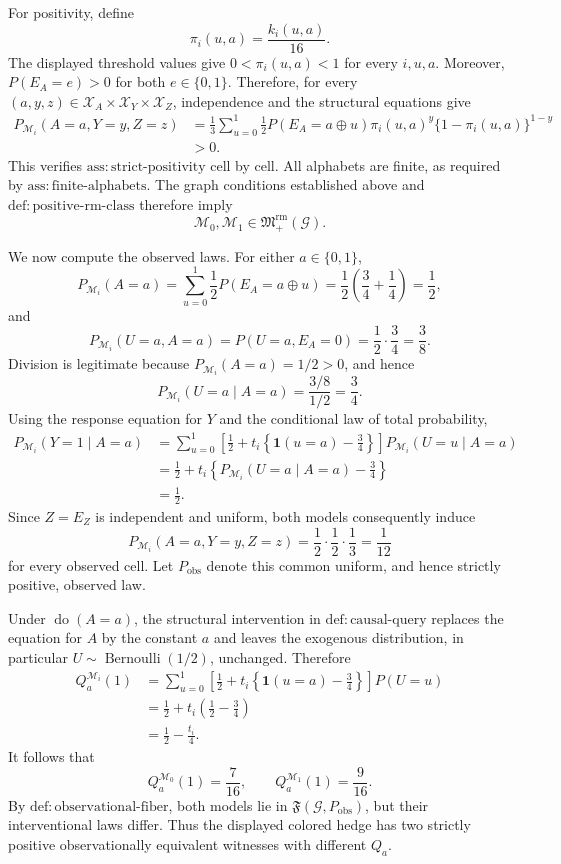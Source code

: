 For positivity, define
\[
 \pi_i(u,a)=\frac{k_i(u,a)}{16}.
\]
The displayed threshold values give \(0<\pi_i(u,a)<1\) for every \(i,u,a\). Moreover, \(P(E_A=e)>0\) for both \(e\in\{0,1\}\). Therefore, for every \((a,y,z)\in\mathcal X_A\times\mathcal X_Y\times\mathcal X_Z\), independence and the structural equations give
\[
 \begin{aligned}
 P_{\mathcal M_i}(A=a,Y=y,Z=z)
 &=\frac13\sum_{u=0}^1
 \frac12 P(E_A=a\mathbin{\oplus}u)
 \pi_i(u,a)^y\{1-\pi_i(u,a)\}^{1-y}\\
 &>0.
 \end{aligned}
\]
This verifies \(\mathrm{ass{:}strict\text{-}positivity}\) cell by cell. All alphabets are finite, as required by \(\mathrm{ass{:}finite\text{-}alphabets}\). The graph conditions established above and \(\mathrm{def{:}positive\text{-}rm\text{-}class}\) therefore imply
\[
 \mathcal M_0,\mathcal M_1
 \in\mathfrak M_{+}^{\mathrm{rm}}(\mathcal G).
\]

We now compute the observed laws. For either \(a\in\{0,1\}\),
\[
 P_{\mathcal M_i}(A=a)
 =\sum_{u=0}^1\frac12P(E_A=a\mathbin{\oplus}u)
 =\frac12\left(\frac34+\frac14\right)
 =\frac12,
\]
and
\[
 P_{\mathcal M_i}(U=a,A=a)
 =P(U=a,E_A=0)
 =\frac12\cdot\frac34
 =\frac38.
\]
Division is legitimate because \(P_{\mathcal M_i}(A=a)=1/2>0\), and hence
\[
 P_{\mathcal M_i}(U=a\mid A=a)
 =\frac{3/8}{1/2}
 =\frac34.
\]
Using the response equation for \(Y\) and the conditional law of total probability,
\[
 \begin{aligned}
 P_{\mathcal M_i}(Y=1\mid A=a)
 &=\sum_{u=0}^1
 \left[\frac12+t_i\left\{\mathbf 1(u=a)-\frac34\right\}\right]
 P_{\mathcal M_i}(U=u\mid A=a)\\
 &=\frac12+t_i\left\{P_{\mathcal M_i}(U=a\mid A=a)-\frac34\right\}\\
 &=\frac12.
 \end{aligned}
\]
Since \(Z=E_Z\) is independent and uniform, both models consequently induce
\[
 P_{\mathcal M_i}(A=a,Y=y,Z=z)
 =\frac12\cdot\frac12\cdot\frac13
 =\frac1{12}
\]
for every observed cell. Let \(P_{\mathrm{obs}}\) denote this common uniform, and hence strictly positive, observed law.

Under \(\operatorname{do}(A=a)\), the structural intervention in \(\mathrm{def{:}causal\text{-}query}\) replaces the equation for \(A\) by the constant \(a\) and leaves the exogenous distribution, in particular \(U\sim\operatorname{Bernoulli}(1/2)\), unchanged. Therefore
\[
 \begin{aligned}
 Q_a^{\mathcal M_i}(1)
 &=\sum_{u=0}^1
 \left[\frac12+t_i\left\{\mathbf 1(u=a)-\frac34\right\}\right]P(U=u)\\
 &=\frac12+t_i\left(\frac12-\frac34\right)\\
 &=\frac12-\frac{t_i}{4}.
 \end{aligned}
\]
It follows that
\[
 Q_a^{\mathcal M_0}(1)=\frac7{16},
 \qquad
 Q_a^{\mathcal M_1}(1)=\frac9{16}.
\]
By \(\mathrm{def{:}observational\text{-}fiber}\), both models lie in \(\mathfrak F(\mathcal G,P_{\mathrm{obs}})\), but their interventional laws differ. Thus the displayed colored hedge has two strictly positive observationally equivalent witnesses with different \(Q_a\).

